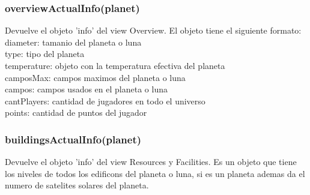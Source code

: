 \documentclass{article}
\newcommand\tab[1][1cm]{\hspace*{#1}}
\begin{document}
        \subsubsection{overviewActualInfo(planet)}
          Devuelve el objeto 'info' del view Overview. El objeto tiene el siguiente formato:
          \tab diameter: tamanio del planeta o luna\\
          \tab type: tipo del planeta\\
          \tab temperature: objeto con la temperatura efectiva del planeta\\
          \tab camposMax: campos maximos del planeta o luna\\
          \tab campos: campos usados en el planeta o luna\\
          \tab cantPlayers: cantidad de jugadores en todo el universo\\
          \tab points: cantidad de puntos del jugador\\
        \subsubsection{buildingsActualInfo(planet)}
          Devuelve el objeto 'info' del view Resources y Facilities. Es un objeto que tiene los niveles de todos los edificons del planeta o luna, si es un planeta ademas da el numero de satelites solares del planeta.
\end{document}
